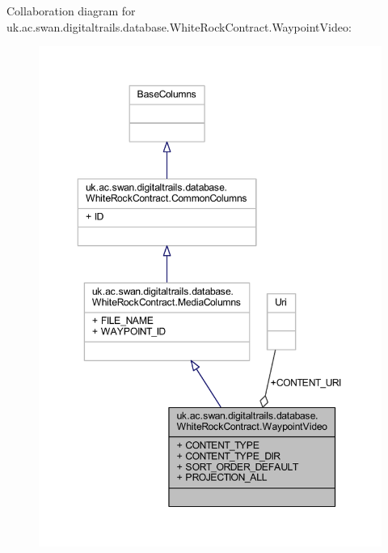 Collaboration diagram for uk.\+ac.\+swan.\+digitaltrails.\+database.\+White\+Rock\+Contract.\+Waypoint\+Video\+:
\nopagebreak
\begin{figure}[H]
\begin{center}
\leavevmode
\includegraphics[width=350pt]{classuk_1_1ac_1_1swan_1_1digitaltrails_1_1database_1_1_white_rock_contract_1_1_waypoint_video__coll__graph}
\end{center}
\end{figure}

